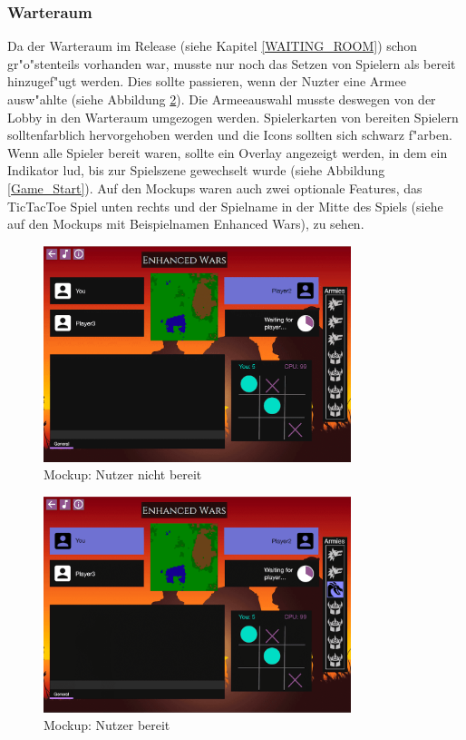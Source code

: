 \documentclass[12pt, titlepage]{scrartcl}
\newcommand{\RN}[1]{%
	\textup{\uppercase\expandafter{\romannumeral#1}}%
}
\begin{document}
		    \subsubsection{Warteraum}
		        Da der Warteraum im Release \RN{2} (siehe Kapitel \ref{WAITING_ROOM}) schon gr"o"stenteils vorhanden war, musste nur noch das Setzen von Spielern als bereit hinzugef"ugt werden. Dies sollte passieren, wenn der Nuzter eine Armee ausw"ahlte (siehe Abbildung \ref{Ready}). Die Armeeauswahl musste deswegen von der Lobby in den Warteraum umgezogen werden. Spielerkarten von bereiten Spielern solltenfarblich hervorgehoben werden und die Icons sollten sich schwarz f"arben. Wenn alle Spieler bereit waren, sollte ein Overlay angezeigt werden, in dem ein Indikator lud, bis zur Spielszene gewechselt wurde (siehe Abbildung \ref{Game_Start}). Auf den Mockups waren auch zwei optionale Features, das TicTacToe Spiel unten rechts und der Spielname in der Mitte des Spiels (siehe auf den Mockups mit Beispielnamen \glqq Enhanced Wars\grqq), zu sehen. \\
		        \begin{figure}[H] 
    				\centering
    				\includegraphics[width=0.8\textwidth]{images/mockups/NotReady.png}
    				\caption{Mockup: Nutzer nicht bereit}
    				\label{Not_Ready}
			    \end{figure}
			    \begin{figure}[H] 
    				\centering
    				\includegraphics[width=0.8\textwidth]{images/mockups/Ready.png}
    				\caption{Mockup: Nutzer bereit}
    				\label{Ready}
			    \end{figure}
\end{document}
